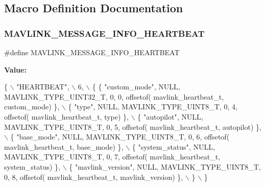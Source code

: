 \subsection{Macro Definition Documentation}
\mbox{\label{minimal_2mavlink__msg__heartbeat_8h_a0fa39f8cc69d7d07d33f36a5666be63a}} 
\subsubsection{M\+A\+V\+L\+I\+N\+K\+\_\+\+M\+E\+S\+S\+A\+G\+E\+\_\+\+I\+N\+F\+O\+\_\+\+H\+E\+A\+R\+T\+B\+E\+AT}
{\footnotesize\ttfamily \#define M\+A\+V\+L\+I\+N\+K\+\_\+\+M\+E\+S\+S\+A\+G\+E\+\_\+\+I\+N\+F\+O\+\_\+\+H\+E\+A\+R\+T\+B\+E\+AT}

{\bfseries Value\+:}
\begin{DoxyCode}
\{ \(\backslash\)
    \textcolor{stringliteral}{"HEARTBEAT"}, \(\backslash\)
    6, \(\backslash\)
    \{  \{ \textcolor{stringliteral}{"custom\_mode"}, NULL, MAVLINK_TYPE_UINT32_T, 0, 0, offsetof(
      mavlink_heartbeat_t, custom\_mode) \}, \(\backslash\)
         \{ \textcolor{stringliteral}{"type"}, NULL, MAVLINK_TYPE_UINT8_T, 0, 4, offsetof(
      mavlink_heartbeat_t, type) \}, \(\backslash\)
         \{ \textcolor{stringliteral}{"autopilot"}, NULL, MAVLINK_TYPE_UINT8_T, 0, 5, offsetof(
      mavlink_heartbeat_t, autopilot) \}, \(\backslash\)
         \{ \textcolor{stringliteral}{"base\_mode"}, NULL, MAVLINK_TYPE_UINT8_T, 0, 6, offsetof(
      mavlink_heartbeat_t, base\_mode) \}, \(\backslash\)
         \{ \textcolor{stringliteral}{"system\_status"}, NULL, MAVLINK_TYPE_UINT8_T, 0, 7, offsetof(
      mavlink_heartbeat_t, system\_status) \}, \(\backslash\)
         \{ \textcolor{stringliteral}{"mavlink\_version"}, NULL, MAVLINK_TYPE_UINT8_T, 0, 8, offsetof(
      mavlink_heartbeat_t, mavlink\_version) \}, \(\backslash\)
         \} \(\backslash\)
\}
\end{DoxyCode}
\mbox{\label{minimal_2mavlink__msg__heartbeat_8h_acb2bf2866eb926f089c52a58b082713e}} 
